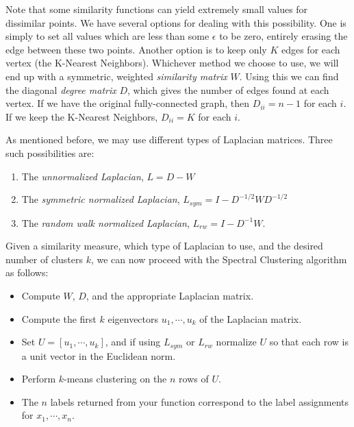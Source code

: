 Note that some similarity functions can yield extremely small values for dissimilar points.  We have several options for dealing with this possibility.  One is simply to set all values which are less than some $\epsilon$ to be zero, entirely erasing the edge between these two points.  Another option is to keep only $K$ edges for each vertex (the K-Nearest Neighbors).  Whichever method we choose to use, we will end up with a symmetric, weighted \emph{similarity matrix} $W$.  Using this we can find the diagonal \emph{degree matrix} $D$, which gives the number of edges found at each vertex.  If we have the original fully-connected graph, then $D_{ii} = n-1$ for each $i$.  If we keep the K-Nearest Neighbors, $D_{ii} = K$ for each $i$.

As mentioned before, we may use different types of Laplacian matrices.  Three such possibilities are:
\begin{enumerate}
    \item The \emph{unnormalized Laplacian}, $L = D - W$
    \item The \emph{symmetric normalized Laplacian}, $L_{sym} = I - D^{-1/2}WD^{-1/2}$
    \item The \emph{random walk normalized Laplacian}, $L_{rw} = I - D^{-1}W$.
 \end{enumerate}

Given a similarity measure, which type of Laplacian to use, and the desired number of clusters $k$, we can now proceed with the Spectral Clustering algorithm as follows:
\begin{itemize}
    \item Compute $W$, $D$, and the appropriate Laplacian matrix.
    \item Compute the first $k$ eigenvectors $u_1, \cdots , u_k$ of the Laplacian matrix.
    \item Set $U = [u_1, \cdots , u_k]$, and if using $L_{sym}$ or $L_{rw}$ normalize $U$ so that each row is a unit vector in the Euclidean norm.
    \item Perform $k$-means clustering on the $n$ rows of $U$.
    \item The $n$ labels returned from your  function correspond to the label assignments for $x_1, \cdots, x_n$.
\end{itemize}

